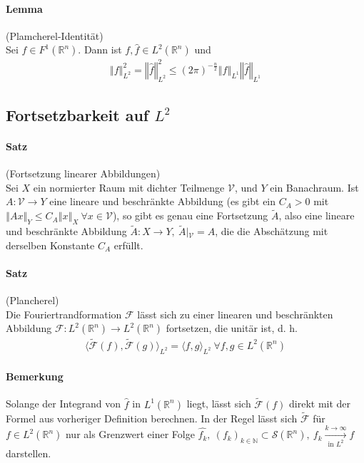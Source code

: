\documentclass[12pt,a4paper,fleqn]{article}
\def\norm#1{{\left\Vert #1 \right\Vert}}
\def\R{{\mathbb{R}}}
\begin{document}
\paragraph{Lemma} (Plamcherel-Identität)\\
Sei $f \in F^1(\R^n)$. Dann ist $f, \widehat{f} \in L^2(\R^n)$ und 
\begin{align*}
\norm{f}^2_{L^2} = \norm{\widehat{f}}^2_{L^2} \leq (2\pi)^{-\frac{n}{2}} \norm{f}_{L^1} \norm{\widehat{f}}_{L^1}
\end{align*}

\subsection{Fortsetzbarkeit auf $L^2$}

\paragraph{Satz} (Fortsetzung linearer Abbildungen)\\
Sei $X$ ein normierter Raum mit dichter Teilmenge $\mathscr{V}$, und $Y$ ein Banachraum.
Ist $A\colon \mathscr{V} \rightarrow Y$ eine lineare und beschränkte Abbildung (es gibt ein $C_A > 0$ mit $\norm{Ax}_Y \leq C_A \norm{x}_X\ \forall x \in \mathscr{V}$), so gibt es genau eine Fortsetzung $\widetilde{A}$, also eine lineare und beschränkte Abbildung $\widetilde{A}\colon X \rightarrow Y,\ \widetilde{A}\left\vert_{\mathscr{V}}\right. = A$, die die Abschätzung mit derselben Konstante $C_A$ erfüllt.

\paragraph{Satz} (Plancherel)\\
Die Fouriertrandformation $\mathscr{F}$ lässt sich zu einer linearen und beschränkten Abbildung $\mathscr{F} \colon L^2(\R^n) \rightarrow L^2(\R^n)$ fortsetzen, die unitär ist, d. h.
\begin{align*}
\langle\widetilde{\mathscr{F}}(f), \widetilde{\mathscr{F}}(g)\rangle_{L^2} = \langle f, g\rangle_{L^2}\ \forall f, g \in L^2(\R^n)
\end{align*}

\paragraph{Bemerkung} Solange der Integrand von $\widehat{f}$ in $L^1(\R^n)$ liegt, lässt sich $\widetilde{\mathscr{F}}(f)$ direkt mit der Formel aus vorheriger Definition berechnen. In der Regel lässt sich $\widetilde{\mathscr{F}}$ für $f \in L^2(\R^n)$ nur als Grenzwert einer Folge $\widehat{f_k},\ (f_k)_{k\in \mathbb{N}} \subset \mathscr{S}(\R^n),\ f_k \xrightarrow[\text{in }L^2]{k\rightarrow \infty} f$ darstellen.
\end{document}

